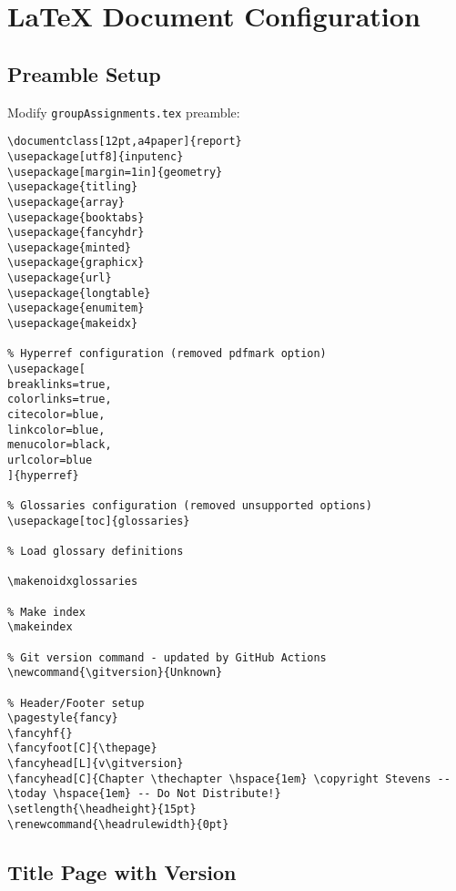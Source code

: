 \section{LaTeX Document Configuration}

\subsection{Preamble Setup}

Modify \texttt{groupAssignments.tex} preamble:

\begin{verbatim}
\documentclass[12pt,a4paper]{report}
\usepackage[utf8]{inputenc}
\usepackage[margin=1in]{geometry}
\usepackage{titling}
\usepackage{array}
\usepackage{booktabs}
\usepackage{fancyhdr}
\usepackage{minted}
\usepackage{graphicx}
\usepackage{url}
\usepackage{longtable}
\usepackage{enumitem}
\usepackage{makeidx}

% Hyperref configuration (removed pdfmark option)
\usepackage[
breaklinks=true, 
colorlinks=true,
citecolor=blue,
linkcolor=blue,
menucolor=black,
urlcolor=blue
]{hyperref}

% Glossaries configuration (removed unsupported options)
\usepackage[toc]{glossaries}

% Load glossary definitions

\makenoidxglossaries

% Make index
\makeindex

% Git version command - updated by GitHub Actions
\newcommand{\gitversion}{Unknown}

% Header/Footer setup
\pagestyle{fancy}
\fancyhf{}
\fancyfoot[C]{\thepage}
\fancyhead[L]{v\gitversion}
\fancyhead[C]{Chapter \thechapter \hspace{1em} \copyright Stevens -- \today \hspace{1em} -- Do Not Distribute!}
\setlength{\headheight}{15pt}
\renewcommand{\headrulewidth}{0pt}
\end{verbatim}

\subsection{Title Page with Version}

